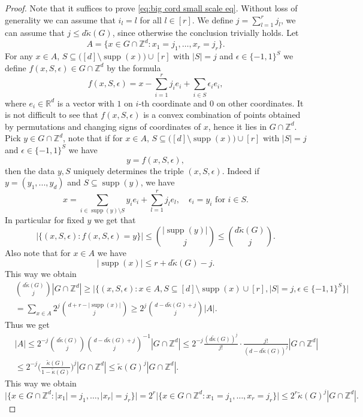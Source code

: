 \documentclass[10pt,a4paper]{amsart}
\numberwithin{equation}{section}
\newcommand{\Z}{\mathbb{Z}}
\newcommand{\R}{\mathbb{R}}
\DeclareMathOperator{\supp}{supp}
\begin{document}
\begin{proof}
    Note that it suffices to prove \eqref{eq:big cord small scale eq}. Without loss of generality we can assume that $i_l=l$ for all $l \in [r]$. We define $j=\sum_{l=1}^rj_l$, we can assume that $j \le d \widetilde{\kappa}(G)$, since otherwise the conclusion trivially holds. Let 
    \[
    A= \Big\{ x \in G \cap \Z^d: x_{1}=j_1, \ldots,x_{r}=j_r \Big\}.
    \]
    For any $x \in A$, $S \subseteq \big([d] \setminus \supp(x)\big) \cup [r]$ with $|S|=j$ and $\epsilon \in \{-1,1\}^S$ we define $f(x,S,\epsilon) \in G \cap \Z^d$ by the formula
    \[
    f(x,S,\epsilon)=x-\sum_{i=1}^r j_i e_i+\sum_{i \in S}\epsilon_i e_i,
    \]
    where $e_i \in \R^d$ is a vector with $1$ on $i$-th coordinate and $0$ on other coordinates.
    It is not difficult to see that $f(x,S,\epsilon)$ is a convex combination of points obtained by permutations and changing signs of coordinates of $x$, hence it lies in $G \cap \Z^d$.
    Pick $y \in G \cap \Z^d$, note that if for
     $x \in A$, $S \subseteq \big([d] \setminus \supp(x)\big) \cup [r]$ with $|S|=j$ and $\epsilon \in \{-1,1\}^S$ we have
     \[
     y=f(x,S,\epsilon),
     \]
     then the data $y,S$ uniquely determines the triple $(x,S,\epsilon)$. Indeed if $y=(y_1,...,y_d)$ and $S \subseteq \supp(y)$, we have
     \[
     x= \sum_{i \in \supp(y) \setminus S} y_ie_i + \sum_{l=1}^r j_l e_l, \quad \epsilon_i=y_i \text{ for } i \in S.
     \]
     In particular for fixed $y$ we get that 
     \[
     \Big|\Big\{(x,S,\epsilon): f(x,S,\epsilon)=y \Big\}\Big| \le \binom{|\supp(y)|}{j}\le \binom{d\widetilde{\kappa}(G)}{j}.
     \]
     Also note that for $x \in A$ we have
     \[
     |\supp(x)| \le r+d\widetilde{\kappa}(G)-j.
     \]
    This way we obtain
    \begin{align*}
        &\binom{d\widetilde{\kappa}(G)}{j} |G \cap \Z^d| \ge \Big|\Big\{(x,S,\epsilon): x \in A,S \subseteq [d] \setminus \supp(x) \cup [r],|S|=j,\epsilon \in \{-1,1\}^S\Big\}\Big|\\
        &= \sum_{x \in A} 2^j \binom{d+r-|\supp(x)|}{j} \ge 2^j \binom{d-d \widetilde{\kappa}(G)+j}{j} |A|.
    \end{align*}
    Thus we get
    \begin{align*}
       &|A| \le 2^{-j}  \binom{d\widetilde{\kappa}(G)}{j} \binom{d-d \widetilde{\kappa}(G)+j}{j}^{-1}|G \cap \Z^d| \le 2^{-j} \frac{(d \widetilde{\kappa}(G))^{j}}{j!} \cdot \frac{j!}{(d-d \widetilde{\kappa}(G))^{j}}|G \cap \Z^d| \\
       &\le 2^{-j} \Big(\frac{\widetilde{\kappa}(G)}{1-\widetilde{\kappa}(G)}\Big)^j |G \cap \Z^d| \le \widetilde{\kappa}(G)^j|G \cap \Z^d|.
    \end{align*}
    This way we obtain
    \[
     \Big| \Big\{ x \in G \cap \Z^d: |x_{1}|=j_1, \ldots,|x_{r}|=j_r \Big\}\Big| =2^r \Big| \Big\{ x \in G \cap \Z^d: x_{1}=j_1, \ldots,x_{r}=j_r \Big\}\Big| \le 2^r \widetilde{\kappa}(G)^j |G \cap \Z^d|.
    \]
\end{proof}
\end{document}

